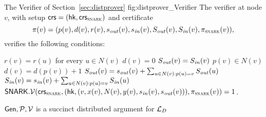 \begin{subfigures}
\begin{nicefig}[h]{The Verifier of Section~\ref{sec:distprover} }{fig:distprover_Verifier}
	The verifier at node $v$, with setup $\mathsf{crs} = (\mathsf{hk}, \mathsf{crs}_\textsc{snark})$
	and
	certificate 
	\begin{equation*}
	\pi(v) = (p(v), d(v), r(v), s_{\mathit{ out }}(v), s_{\mathit{ in }}(v), S_{\mathit{ out }}(v), S_{\mathit{ in }}(v), \pi_\textsc{snark}(v)),
\end{equation*}
verifies the following conditions:
\begin{algorithmic}[1]
	\State $r(v) = r(u)$ for every $u \in N(v)$
		\State $d(v) = 0$
		\State $S_{\mathit{ out }}(v) = S_{\mathit{ in }}(v)$
	\Else
		\State $p(v) \in N(v)$
		\State $d(v) = d(p(v)) + 1$
	\EndIf
	\State $S_{\mathit{ out }}(v) = s_{\mathit{ out }}(v) + \sum_{u \in N(v) : p(u) = v} S_{\mathit{ out }}(u)$
	\State $S_{\mathit{ in }}(v) = s_{\mathit{ in }}(v) + \sum_{u \in N(v) : p(u) = v} S_{\mathit{ in }}(u)$
	\State $\mathsf{SNARK}.\mathcal{V}(\mathsf{crs}_\textsc{snark}, (\mathsf{hk}, (v, x(v), N(v), y(v), s_{\mathit{ in }}(v), s_{\mathit{ out }}(v))), \pi_\textsc{snark}(v)) = 1$.
\end{algorithmic}
\end{nicefig}

\end{subfigures}


\begin{claim}
    $\mathsf{Gen}, \mathcal{P}, \mathcal{V}$ is a succinct distributed argument for $\mathcal{L}_D$
\end{claim}

